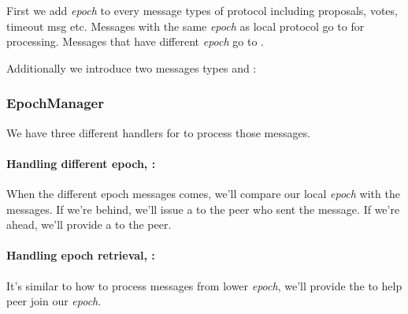 First we add \emph{epoch} to every message types of \LBFT protocol including proposals, votes, timeout msg etc. Messages
with the same \emph{epoch} as local \LBFT protocol go to \LBFT for processing. Messages that have different \emph{epoch}
go to .

Additionally we introduce two messages types  and :

\begin{algorithm}[H]
\myalgorithm
{\SetAlgoNoLine
{}

\BlankLine
{}

\BlankLine
{}
}
\end{algorithm}

\subsubsection{EpochManager}
We have three different handlers for  to process those messages.

\paragraph{Handling different epoch, :}

When the different \LBFT epoch messages comes, we'll compare our local \emph{epoch} with the messages. If we're behind, we'll
issue a  to the peer who sent the message. If we're ahead, we'll provide
a  to the peer.

\paragraph{Handling epoch retrieval, :}
It's similar to how to process messages from lower \emph{epoch}, we'll provide the  to help peer join our
\emph{epoch}.

